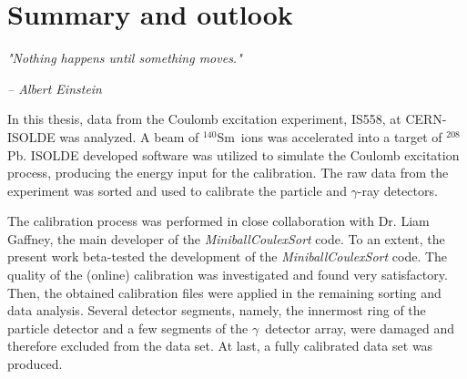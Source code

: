 \documentclass[twoside,english]{uiofysmaster/uiofysmaster}
\newcommand{\Sm}{$^{140}$Sm} %
\newcommand{\Pb}{$^{208}$Pb}
\newcommand{\ga}{$\gamma$}
\begin{document}


\chapter{Summary and outlook}\label{ch:SO}
\epigraph{\textit{"Nothing happens until something moves."}}{\textit{– Albert Einstein}}


In this thesis, data from the Coulomb excitation experiment, IS558, at CERN-ISOLDE was analyzed. 
A beam of \Sm\ ions was accelerated into a target of \Pb.
ISOLDE developed software was utilized to simulate the Coulomb excitation process, producing the energy input for the calibration.
The raw data from the experiment was sorted and used to calibrate the particle and \ga-ray detectors.

The calibration process was performed in close collaboration with Dr. Liam Gaffney, the main developer of the \textsl{MiniballCoulexSort} code.
To an extent, the present work beta-tested the development of the \textsl{MiniballCoulexSort} code.
The quality of the (online) calibration was investigated and found very satisfactory. 
Then, the obtained calibration files were applied in the remaining sorting and data analysis.
Several detector segments, namely, the innermost ring of the particle detector and a few segments of the \ga\ detector array, were damaged and therefore excluded from the data set.
At last, a fully calibrated data set was produced. 
\end{document}
